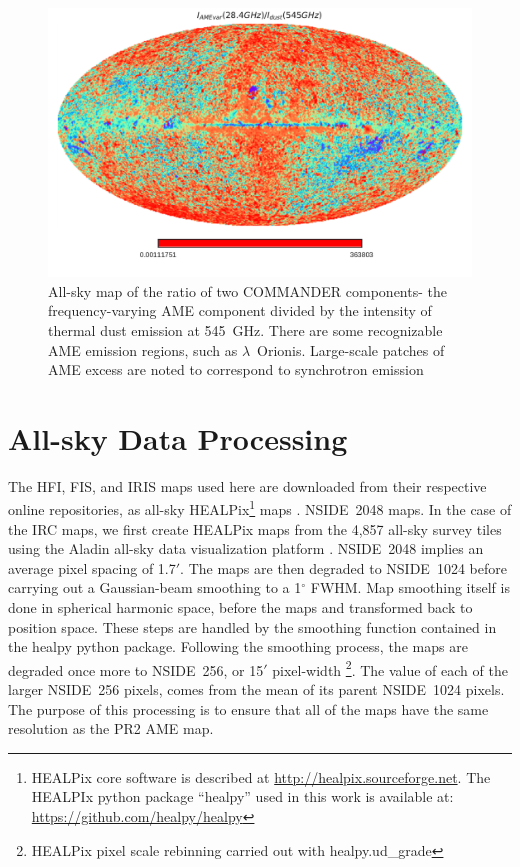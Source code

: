           \begin{figure}
               \centering
               \includegraphics[width=\textwidth]{../Plots/ch_datasources/R_PCAMEtoPCRad.pdf}
               \caption{All-sky map of the ratio of two COMMANDER components- the frequency-varying AME component divided by the intensity of thermal dust emission at 545~GHz. There are some recognizable AME emission regions, such as $\lambda$~Orionis. Large-scale patches of AME excess are noted to correspond to synchrotron emission \citep{hensley16}}
               \label{fig:R_PCAMEtoPCdust}
           \end{figure}

  \section{All-sky Data Processing}

        The HFI, FIS, and IRIS maps used here are downloaded from their respective online repositories, as all-sky HEALPix\footnote{HEALPix core software is described at \url{http://healpix.sourceforge.net}. The HEALPIx python package ``healpy'' used in this work is available at: \url{https://github.com/healpy/healpy}} maps \citep{gorski05}.   NSIDE~2048 maps. In the case of the IRC maps, we first create HEALPix maps from the 4,857 all-sky survey tiles using the Aladin all-sky data visualization platform \citep{bonnarel00}. NSIDE~2048 implies an average pixel spacing of 1.7$'$. The maps are then degraded to NSIDE~1024 before carrying out a Gaussian-beam smoothing to a 1$^{\circ}$ FWHM. Map smoothing itself is done in spherical harmonic space, before the maps and transformed back to position space. These steps are handled by the smoothing function contained in the healpy python package. Following the smoothing process, the maps are degraded once more to NSIDE~256, or 15$'$ pixel-width \footnote{HEALPix pixel scale rebinning carried out with healpy.ud\_grade}. The value of each of the larger NSIDE~256 pixels, comes from the mean of its parent NSIDE~1024 pixels. The purpose of this processing is to ensure that all of the maps have the same resolution as the PR2 AME map.
